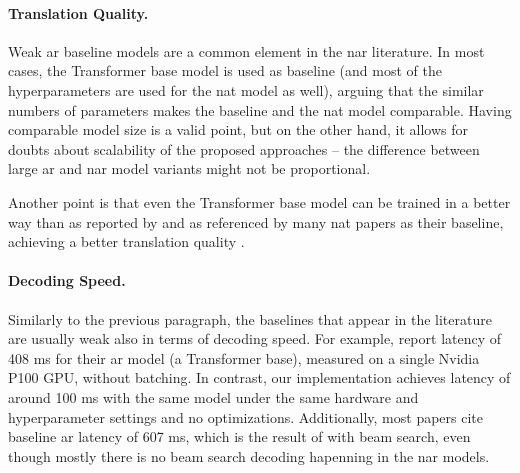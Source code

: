 \paragraph{Translation Quality.} Weak \acl{ar} baseline models are a common
element in the \acl{nar} literature. In most cases, the Transformer base model
is used as baseline (and most of the hyperparameters are used for the \ac{nat}
model as well), arguing that the similar numbers of parameters makes the
baseline and the \ac{nat} model comparable. Having comparable model size is a
valid point, but on the other hand, it allows for doubts about scalability of
the proposed approaches -- the difference between large \ac{ar} and \ac{nar}
model variants might not be proportional.

Another point is that even the Transformer base model can be trained in a
better way than as reported by \citet{vaswani2017attention} and as referenced
by many \ac{nat} papers as their baseline, achieving a better translation
quality \citep{popel-bojar-2018-training}.

\paragraph{Decoding Speed.} Similarly to the previous paragraph, the baselines
that appear in the literature are usually weak also in terms of decoding speed.
For example, \citet{gu2017nonautoregressive} report latency of 408 ms for their
\ac{ar} model (a Transformer base), measured on a single Nvidia P100 GPU,
without batching. In contrast, our implementation achieves latency of around
100 ms with the same model under the same hardware and hyperparameter settings
and no optimizations. Additionally, most papers cite baseline \ac{ar} latency
of 607 ms, which is the result of \citet{gu2017nonautoregressive} with beam
search, even though mostly there is no beam search decoding hapenning in the
\ac{nar} models.




